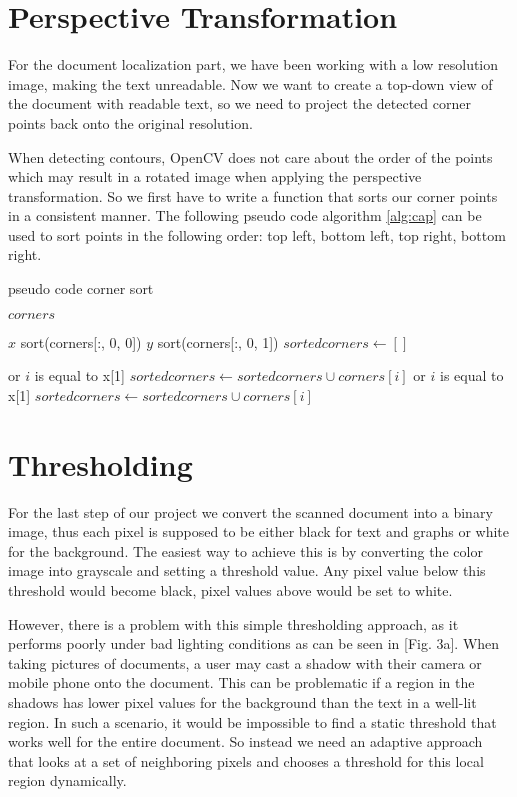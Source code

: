 \documentclass[bibliography=totoc]{scrartcl}
\begin{document}
	\section{Perspective Transformation}
	For the document localization part, we have been working with a low resolution image, making the text unreadable.
	Now we want to create a top-down view of the document with readable text, so we need to project the detected corner points back onto the original resolution. 

	When detecting contours, OpenCV does not care about the order of the points which may result in a rotated image when applying the perspective transformation.
	So we first have to write a function that sorts our corner points in a consistent manner.
	The following pseudo code algorithm \ref{alg:cap} can be used to sort points in the following order: top left, bottom left, top right, bottom right.


\begin{algorithm}[hbt!]
\caption{pseudo code corner sort}\label{alg:cap}
\begin{algorithmic}
\Require $corners$

\State $x$ \gets sort(corners[:, 0, 0]) 
\State $y$ \gets sort(corners[:, 0, 1]) 
\State $sortedcorners \gets []$

 or $i$ is equal to x[1]
    \State $sortedcorners \gets sortedcorners \cup corners[i]$
\EndIf
\EndWhile
{}
 or $i$ is equal to x[1]
    \State $sortedcorners \gets sortedcorners \cup corners[i]$
    
\EndIf
\EndWhile
\end{algorithmic}
\end{algorithm}
	

	
	\section{Thresholding}
	For the last step of our project we convert the scanned document into a binary image, thus each pixel is supposed to be either black for text and graphs or white for the background.
	The easiest way to achieve this is by converting the color image into grayscale and setting a threshold value. 
	Any pixel value below this threshold would become black, pixel values above would be set to white.

	However, there is a problem with this simple thresholding approach, as it performs poorly under bad lighting conditions as can be seen in [Fig. 3a].
	When taking pictures of documents, a user may cast a shadow with their camera or mobile phone onto the document. 
	This can be problematic if a region in the shadows has lower pixel values for the background than the text in a well-lit region.
	In such a scenario, it would be impossible to find a static threshold that works well for the entire document.
	So instead we need an adaptive approach that looks at a set of neighboring pixels and chooses a threshold for this local region dynamically.
\end{document}
